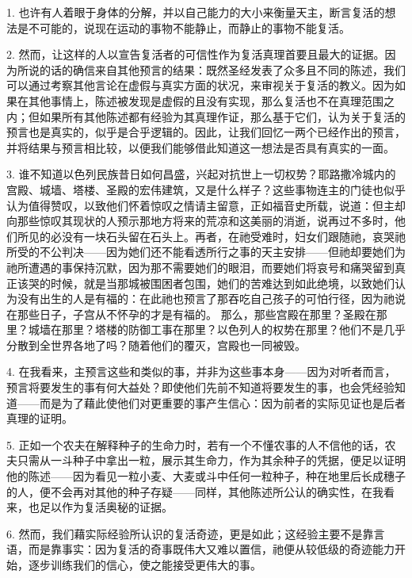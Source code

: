 1. 也许有人着眼于身体的分解，并以自己能力的大小来衡量天主，断言复活的想法是不可能的，说现在运动的事物不能静止，而静止的事物不能复活。\par

2. 然而，让这样的人以宣告复活者的可信性作为复活真理首要且最大的证据。因为所说的话的确信来自其他预言的结果：既然圣经发表了众多且不同的陈述，我们可以通过考察其他言论在虚假与真实方面的状况，来审视关于复活的教义。因为如果在其他事情上，陈述被发现是虚假的且没有实现，那么复活也不在真理范围之内；但如果所有其他陈述都有经验为其真理作证，那么基于它们，认为关于复活的预言也是真实的，似乎是合乎逻辑的。因此，让我们回忆一两个已经作出的预言，并将结果与预言相比较，以便我们能够借此知道这一想法是否具有真实的一面。\par

3. 谁不知道以色列民族昔日如何昌盛，兴起对抗世上一切权势？耶路撒冷城内的宫殿、城墙、塔楼、圣殿的宏伟建筑，又是什么样子？这些事物连主的门徒也似乎认为值得赞叹，以致他们怀着惊叹之情请主留意，正如福音史所载，说道：但主却向那些惊叹其现状的人预示那地方将来的荒凉和这美丽的消逝，说再过不多时，他们所见的必没有一块石头留在石头上。再者，在祂受难时，妇女们跟随祂，哀哭祂所受的不公判决——因为她们还不能看透所行之事的天主安排——但祂却要她们为祂所遭遇的事保持沉默，因为那不需要她们的眼泪，而要她们将哀号和痛哭留到真正该哭的时候，就是当那城被围困者包围，她们的苦难达到如此绝境，以致她们认为没有出生的人是有福的：在此祂也预言了那吞吃自己孩子的可怕行径，因为祂说在那些日子，子宫从不怀孕的才是有福的。 那么，那些宫殿在那里？圣殿在那里？城墙在那里？塔楼的防御工事在那里？以色列人的权势在那里？他们不是几乎分散到全世界各地了吗？随着他们的覆灭，宫殿也一同被毁。\par

4. 在我看来，主预言这些和类似的事，并非为这些事本身——因为对听者而言，预言将要发生的事有何大益处？即使他们先前不知道将要发生的事，也会凭经验知道——而是为了藉此使他们对更重要的事产生信心：因为前者的实际见证也是后者真理的证明。\par

5. 正如一个农夫在解释种子的生命力时，若有一个不懂农事的人不信他的话，农夫只需从一斗种子中拿出一粒，展示其生命力，作为其余种子的凭据，便足以证明他的陈述——因为看见一粒小麦、大麦或斗中任何一粒种子，种在地里后长成穗子的人，便不会再对其他的种子存疑——同样，其他陈述所公认的确实性，在我看来，也足以作为复活奥秘的证据。\par

6. 然而，我们藉实际经验所认识的复活奇迹，更是如此；这经验主要不是靠言语，而是靠事实：因为复活的奇事既伟大又难以置信，祂便从较低级的奇迹能力开始，逐步训练我们的信心，使之能接受更伟大的事。\par

